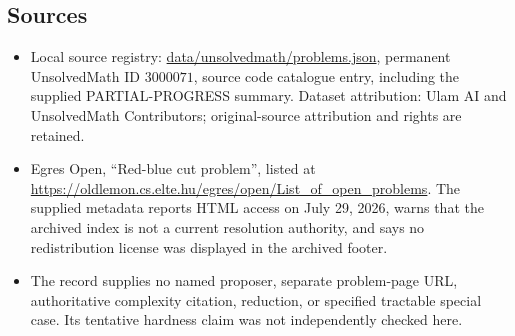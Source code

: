\documentclass[11pt]{article}
\begin{document}
\subsection{Sources}
\begin{itemize}
\item Local source registry: \url{data/unsolvedmath/problems.json}, permanent UnsolvedMath ID $3000071$, source code catalogue entry, including the supplied PARTIAL-PROGRESS summary. Dataset attribution: Ulam AI and UnsolvedMath Contributors; original-source attribution and rights are retained.
\item Egres Open, ``Red-blue cut problem'', listed at \url{https://oldlemon.cs.elte.hu/egres/open/List_of_open_problems}. The supplied metadata reports HTML access on July 29, 2026, warns that the archived index is not a current resolution authority, and says no redistribution license was displayed in the archived footer.
\item The record supplies no named proposer, separate problem-page URL, authoritative complexity citation, reduction, or specified tractable special case. Its tentative hardness claim was not independently checked here.
\end{itemize}
\end{document}

